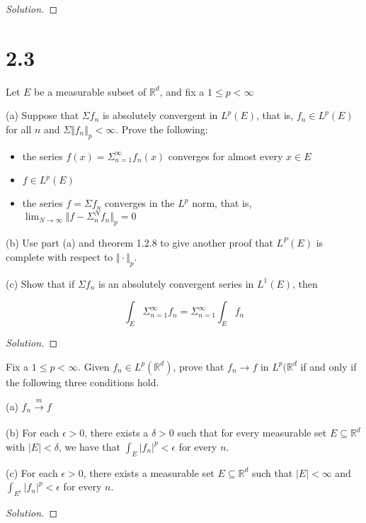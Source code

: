 \documentclass[10pt]{article}
\newenvironment{problem}[2][Problem]{\begin{trivlist}
\item[\hskip \labelsep {\bfseries #1}\hskip \labelsep {\bfseries #2.}]}{\end{trivlist}}
\begin{document}
\begin{proof}[Solution]


\end{proof}

\section*{2.3}

\begin{problem}{7.3.22}

Let $E$ be a measurable subset of $\mathbb{R}^d$, and fix a $1 \leq p < \infty$

(a) Suppose that $\Sigma f_n$ is absolutely convergent in $L^p(E)$, that is, $f_n \in L^p(E)$ for all $n$ and $\Sigma \Vert f_n \Vert_p < \infty$. Prove the following:

\begin{itemize}
\item the series $f(x) = \Sigma_{n=1}^\infty f_n(x)$ converges for almost every $x \in E$ \\
\item $f \in L^p(E)$\\
\item the series $f = \Sigma f_n$ converges in the $L^p$ norm, that is, $\lim_{N \to \infty} \Vert f - \Sigma_n^N f_n \Vert_p = 0$
\end{itemize}

(b) Use part (a) and theorem 1.2.8 to give another proof that $L^P(E)$ is complete with respect to $\Vert \cdot \Vert_p$.

(c) Show that if $\Sigma f_n$ is an absolutely convergent series in $L^1(E)$, then

$$\int_E \Sigma_{n=1}^\infty f_n = \Sigma_{n=1}^\infty \int_E f_n $$


\end{problem}
\begin{proof}[Solution]

\end{proof}


\begin{problem}{7.3.23}

Fix a $1 \leq p < \infty$. Given $f_n \in L^p(\mathbb{R}^d)$, prove that $f_n \to f$ in $L^p(\mathbb{R}^d$ if and only if the following three conditions hold.

(a) $f_n \xrightarrow[]{m} f$

(b) For each $\epsilon > 0$, there exists a $\delta > 0$ such that for every measurable set $E \subseteq \mathbb{R}^d$ with $|E| < \delta$, we have that $\int_E |f_n|^p < \epsilon$ for every $n$.

(c) For each $\epsilon > 0$, there exists a measurable set $E \subseteq \mathbb{R}^d$ such that $|E| < \infty$ and $ \int_{E^c} |f_n|^p < \epsilon$ for every $n$.

\end{problem}
\begin{proof}[Solution]

\end{proof}

 
\end{document}
